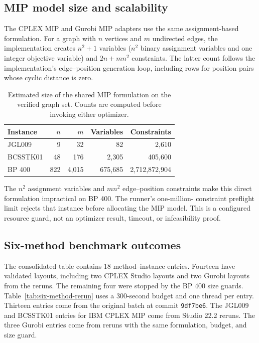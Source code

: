 
\subsection{MIP model size and scalability}
The CPLEX MIP and Gurobi MIP adapters use the same assignment-based
formulation. For a graph with $n$ vertices and $m$ undirected edges, the
implementation creates $n^2+1$ variables ($n^2$ binary assignment variables
and one integer objective variable) and $2n+mn^2$ constraints. The latter
count follows the implementation's edge--position generation loop, including
rows for position pairs whose cyclic distance is zero.

\begin{table}[t]
\centering
\small
\caption{Estimated size of the shared MIP formulation on the verified graph
set. Counts are computed before invoking either optimizer.}
\label{tab:mip-model-size}
\begin{tabular}{lrrrr}
\hline
Instance & $n$ & $m$ & Variables & Constraints \\
\hline
JGL009 & 9 & 32 & 82 & 2,610 \\
BCSSTK01 & 48 & 176 & 2,305 & 405,600 \\
BP 400 & 822 & 4,015 & 675,685 & 2,712,872,904 \\
\hline
\end{tabular}
\end{table}

The $n^2$ assignment variables and $mn^2$ edge--position constraints make
this direct formulation impractical on BP 400. The runner's one-million-
constraint preflight limit rejects that instance before allocating the MIP
model. This is a configured resource guard, not an optimizer result, timeout,
or infeasibility proof.

\subsection{Six-method benchmark outcomes}
The consolidated table contains 18 method--instance entries. Fourteen
have validated layouts, including two CPLEX Studio layouts and two Gurobi layouts from the reruns. The
remaining four were stopped by the BP 400 size guards.
Table~\ref{tab:six-method-rerun} uses a 300-second budget and one thread
per entry. Thirteen entries come from the original batch at commit
\texttt{9df7be6}. The JGL009 and BCSSTK01 entries for IBM CPLEX MIP
come from Studio 22.2 reruns. The three Gurobi entries come from reruns with the same formulation, budget, and size guard.

